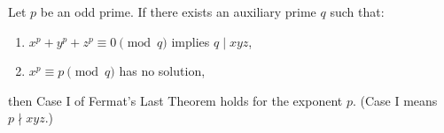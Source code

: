 Let $p$ be an odd prime. If there exists an auxiliary prime $q$ such that:
\begin{enumerate}
\item $x^p + y^p + z^p \equiv 0 \pmod{q}$ implies $q \mid xyz$,
\item $x^p \equiv p \pmod{q}$ has no solution,
\end{enumerate}
then Case I of Fermat's Last Theorem holds for the exponent $p$. (Case I means $p \nmid xyz$.)
